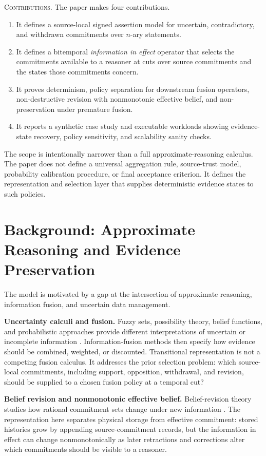 \documentclass[a4paper,fleqn]{cas-sc}
\newenvironment{criteria}{%
  \begin{enumerate}
  \renewcommand{\labelenumi}{\footnotesize\arabic{enumi}}%
  \setlength{\itemsep}{0.3ex}%
  \setlength{\parsep}{0pt}%
}{%
  \end{enumerate}
}
\theoremstyle{plain}
\theoremstyle{remark}
\begin{document}
\textsc{Contributions.} The paper makes four contributions.
\begin{criteria}
\item It defines a source-local signed assertion model for uncertain, contradictory, and withdrawn commitments over \(n\)-ary statements.
\item It defines a bitemporal \emph{information in effect} operator that selects the commitments available to a reasoner at cuts over source commitments and the states those commitments concern.
\item It proves determinism, policy separation for downstream fusion operators, non-destructive revision with nonmonotonic effective belief, and non-preservation under premature fusion.
\item It reports a synthetic case study and executable workloads showing evidence-state recovery, policy sensitivity, and scalability sanity checks.
\end{criteria}

The scope is intentionally narrower than a full approximate-reasoning calculus. The paper does not define a universal aggregation rule, source-trust model, probability calibration procedure, or final acceptance criterion. It defines the representation and selection layer that supplies deterministic evidence states to such policies.

\section{Background: Approximate Reasoning and Evidence Preservation}
\label{Sec:background}
The model is motivated by a gap at the intersection of approximate reasoning, information fusion, and uncertain data management.

\textbf{Uncertainty calculi and fusion.}
Fuzzy sets, possibility theory, belief functions, and probabilistic approaches provide different interpretations of uncertain or incomplete information \cite{Zadeh1965,DuboisPrade1988,Dempster1967,Shafer1976}. Information-fusion methods then specify how evidence should be combined, weighted, or discounted. Transitional representation is not a competing fusion calculus. It addresses the prior selection problem: which source-local commitments, including support, opposition, withdrawal, and revision, should be supplied to a chosen fusion policy at a temporal cut?

\textbf{Belief revision and nonmonotonic effective belief.}
Belief-revision theory studies how rational commitment sets change under new information \cite{AGM1985}. The representation here separates physical storage from effective commitment: stored histories grow by appending source-commitment records, but the information in effect can change nonmonotonically as later retractions and corrections alter which commitments should be visible to a reasoner.
\end{document}
